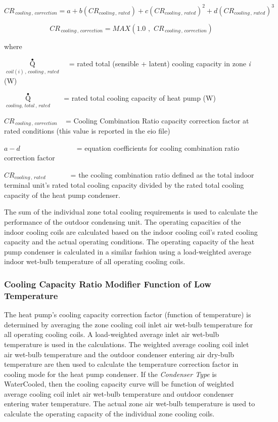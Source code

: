 \begin{equation}
C{R_{\,cooling\,,\,correction}} = a + b\left( {C{R_{cooling\,,\,rated}}} \right) + c{\left( {C{R_{cooling\,,\,rated}}} \right)^2} + d{\left( {C{R_{cooling\,,\,rated}}} \right)^3}
\end{equation}

\begin{equation}
C{R_{\,cooling\,,\,correction}} = MAX\left( {1.0\,\,,\,\,C{R_{\,cooling\,,\,correction}}} \right)
\end{equation}

where

\({\mathop Q\limits^ \bullet_{coil(i)\,,\,cooling\,,\,rated}}\) ~ = rated total (sensible + latent) cooling capacity in zone \emph{i} (W)

\({\mathop Q\limits^ \bullet_{cooling,\,total\,,\,rated}}\) ~~ = rated total cooling capacity of heat pump (W)

\(C{R_{\,cooling\,,\,correction}}\) ~ = Cooling Combination Ratio capacity correction factor at rated conditions (this value is reported in the eio file)

\(a - d\) ~~~~~~~ ~~~~~~~ = equation coefficients for cooling combination ratio correction factor

\(C{R_{cooling\,,\,rated}}\) ~~ ~~~ = the cooling combination ratio defined as the total indoor terminal unit's rated total cooling capacity divided by the rated total cooling capacity of the heat pump condenser.

The sum of the individual zone total cooling requirements is used to calculate the performance of the outdoor condensing unit. The operating capacities of the indoor cooling coils are calculated based on the indoor cooling coil's rated cooling capacity and the actual operating conditions. The operating capacity of the heat pump condenser is calculated in a similar fashion using a load-weighted average indoor wet-bulb temperature of all operating cooling coils.

\subsubsection{Cooling Capacity Ratio Modifier Function of Low Temperature}\label{cooling-capacity-ratio-modifier-function-of-low-temperature}

The heat pump's cooling capacity correction factor (function of temperature) is determined by averaging the zone cooling coil inlet air wet-bulb temperature for all operating cooling coils. A load-weighted average inlet air wet-bulb temperature is used in the calculations. The weighted average cooling coil inlet air wet-bulb temperature and the outdoor condenser entering air dry-bulb temperature are then used to calculate the temperature correction factor in cooling mode for the heat pump condenser. If the \textit{Condenser Type} is WaterCooled, then the cooling capacity curve will be function of weighted average cooling coil inlet air wet-bulb temperature and outdoor condenser entering water temperature. The actual zone air wet-bulb temperature is used to calculate the operating capacity of the individual zone cooling coils.

